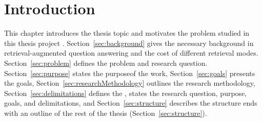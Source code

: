 \documentclass[english, bibtex]{kththesis}               %
\numberwithin{listing}{chapter}
\providecommand{\DIFaddtex}[1]{{\protect\color{blue} \sf #1}} %
\providecommand{\DIFdeltex}[1]{{\protect\color{red} \scriptsize #1}} %
\providecommand{\DIFaddbegin}{} %
\providecommand{\DIFaddend}{} %
\providecommand{\DIFdelbegin}{} %
\providecommand{\DIFdelend}{} %
\providecommand{\DIFadd}[1]{\texorpdfstring{\DIFaddtex{#1}}{#1}} %
\providecommand{\DIFdel}[1]{\texorpdfstring{\DIFdeltex{#1}}{}} %
\begin{document}
\cleardoublepage

\listoftables
\cleardoublepage
\DIFdelbegin %
\DIFdelend \DIFaddbegin {}
\DIFaddend %
\printglossary[style=mylong, type=\acronymtype, title={List of acronyms and abbreviations}]

\ifnomenclature
    \cleardoublepage
    \printnomenclature
\fi

\label{pg:lastPageofPreface}
\mainmatter
\glsresetall
\renewcommand{\chaptermark}[1]{\markboth{#1}{}}
\chapter{Introduction}
\label{ch:introduction}

This chapter introduces the thesis topic and motivates the problem studied in this thesis project\DIFdelbegin \DIFdel{. Section~\ref{sec:background} gives the necessary background in retrieval-augmented question answering and the cost of different retrieval modes. Section~\ref{sec:problem} defines the problem and research question. Section~\ref{sec:purpose} states the purposeof the work, Section~\ref{sec:goals} presents the goals, Section~\ref{sec:researchMethodology} outlines the research methodology, Section~\ref{sec:delimitations} defines the }\DIFdelend \DIFaddbegin \DIFadd{, states the research question, purpose, goals, and }\DIFaddend delimitations, and \DIFdelbegin \DIFdel{Section~\ref{sec:structure} describes the structure }\DIFdelend \DIFaddbegin \DIFadd{ends with an outline }\DIFaddend of the rest of the thesis \DIFaddbegin \DIFadd{(Section~\ref{sec:structure})}\DIFaddend .
\end{document}
